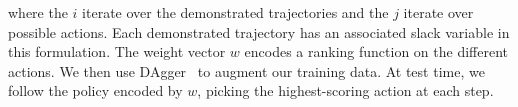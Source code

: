 where the $i$ iterate over the demonstrated trajectories and the $j$ iterate over possible actions. Each
demonstrated trajectory has an associated slack variable in this formulation.
The weight vector $w$ encodes a ranking function on the different actions.
We then use {\sc DAgger}~\cite{dagger} to augment our training data. At test time, we follow the policy encoded by
$w$, picking the highest-scoring action at each step.


